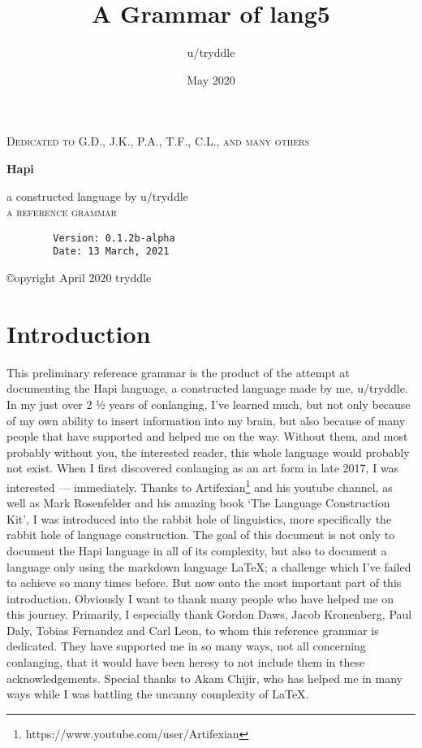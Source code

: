 \documentclass[a4paper, 12pt, oneside]{memoir}
\title{A Grammar of lang5}
\author{u/tryddle}
\date{May 2020}
\makeatletter
\newlength\drop
\newcommand*\titleM{\begingroup%
\setlength\drop{0.08\textheight}
\centering
{\scshape Dedicated to G.D., J.K., P.A., T.F., C.L., and many others\par}
\vspace*{\drop}
   
\vspace*{\drop}
\begin{flushleft}
{\HUGE\bfseries Hapi}\\
\end{flushleft}
\vspace*{\drop}
\vspace*{\drop}
\begin{flushright}
{\LARGE a constructed language by u/tryddle}\\[\baselineskip]
{\scshape a reference grammar}\\[\baselineskip]
{\scshape \@date}\par
\end{flushright}


\endgroup}
\makeatother
\begin{document}
\begin{titlingpage}
\titleM{}
\end{titlingpage}
\pagebreak
{}

\vspace*{\fill}

\begin{center}
    \begin{verbatim}
        Version: 0.1.2b-alpha
        Date: 13 March, 2021
    \end{verbatim}
    ©opyright April 2020 tryddle
\end{center}

\vspace*{\fill}

\restoregeometry

\pagebreak
\setcounter{tocdepth}{4}
\tableofcontents
\newpage 
\listoffigures
\listoftables
\newpage
\printglossaries
\newpage

\chapter{Introduction}
This preliminary reference grammar is the product of the attempt at documenting the Hapi language, a constructed language made by me, u/tryddle. In my just over 2 ½ years of conlanging, I've learned much, but not only because of my own ability to insert information into my brain, but also because of many people that have supported and helped me on the way. Without them, and most probably without you, the interested reader, this whole language would probably not exist. When I first discovered conlanging as an art form in late 2017, I was interested — immediately. Thanks to Artifexian\footnote{https://www.youtube.com/user/Artifexian} and his youtube channel, as well as Mark Rosenfelder and his amazing book `The Language Construction Kit', I was introduced into the rabbit hole of linguistics, more specifically the rabbit hole of language construction. 
The goal of this document is not only to document the Hapi language in all of its complexity, but also to document a language only using the markdown language \LaTeX; a challenge which I've failed to achieve so many times before. 
But now onto the most important part of this introduction. Obviously I want to thank many people who have helped me on this journey. Primarily, I especially thank Gordon Daws, Jacob Kronenberg, Paul Daly, Tobias Fernandez and Carl Leon, to whom this reference grammar is dedicated. They have supported me in so many ways, not all concerning conlanging, that it would have been heresy to not include them in these acknowledgements. Special thanks to Akam Chijir, who has helped me in many ways while I was battling the uncanny complexity of \LaTeX.
\end{document}
